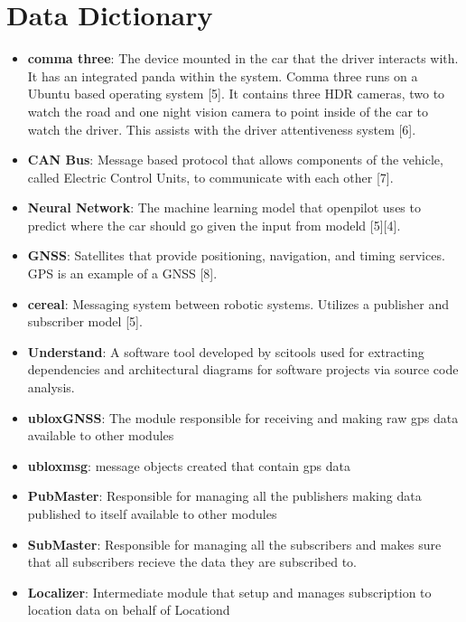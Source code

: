 \documentclass[12pt]{article}
\begin{document}
\section{Data Dictionary}

    \begin{itemize}

        \item[] \textbf{comma three}: The device mounted in the car that the driver interacts with. It has an integrated panda within the system. Comma three runs on a Ubuntu based operating system [5]. It contains three HDR cameras, two to watch the road and one night vision camera to point inside of the car to watch the driver. This assists with the driver attentiveness system [6].
        \item[] \textbf{CAN Bus}: Message based protocol that allows components of the vehicle, called Electric Control Units, to communicate with each other [7].
        \item[] \textbf{Neural Network}: The machine learning model that openpilot uses to predict where the car should go given the input from modeld [5][4].
        \item[] \textbf{GNSS}: Satellites that provide positioning, navigation, and timing services. GPS is an example of a GNSS [8].
        \item[] \textbf{cereal}: Messaging system between robotic systems. Utilizes a publisher and subscriber model [5].
        \item[] \textbf{Understand}: A software tool developed by scitools used for extracting dependencies and architectural diagrams for software projects via source code analysis.
        \item[] \textbf{ubloxGNSS}: The module responsible for receiving and making raw gps data available to other modules 
        \item[] \textbf{ubloxmsg}: message objects created that contain gps data
        \item[] \textbf{PubMaster}: Responsible for managing all the publishers making data published to itself available to other modules
        \item[] \textbf{SubMaster}: Responsible for managing all the subscribers and makes sure that all subscribers recieve the data they are subscribed to. 
        \item[] \textbf{Localizer}: Intermediate module that setup and manages subscription to location data on behalf of Locationd
    \end{itemize}
\end{document}
